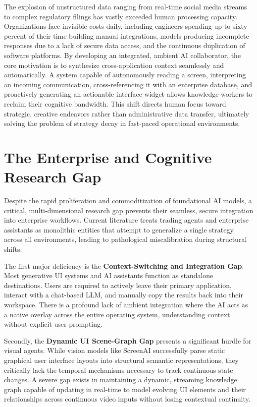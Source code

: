 \documentclass[12pt, a4paper]{report}
\begin{document}
The explosion of unstructured data ranging from real-time social media streams to complex regulatory filings has vastly exceeded human processing capacity. Organizations face invisible costs daily, including engineers spending up to sixty percent of their time building manual integrations, models producing incomplete responses due to a lack of secure data access, and the continuous duplication of software platforms.\cite{rootstack2026} By developing an integrated, ambient AI collaborator, the core motivation is to synthesize cross-application context seamlessly and automatically. A system capable of autonomously reading a screen, interpreting an incoming communication, cross-referencing it with an enterprise database, and proactively generating an actionable interface widget allows knowledge workers to reclaim their cognitive bandwidth.\cite{hojo2025} This shift directs human focus toward strategic, creative endeavors rather than administrative data transfer, ultimately solving the problem of strategy decay in fast-paced operational environments.

\section{The Enterprise and Cognitive Research Gap}
Despite the rapid proliferation and commoditization of foundational AI models, a critical, multi-dimensional research gap prevents their seamless, secure integration into enterprise workflows. Current literature treats trading agents and enterprise assistants as monolithic entities that attempt to generalize a single strategy across all environments, leading to pathological miscalibration during structural shifts.

The first major deficiency is the \textbf{Context-Switching and Integration Gap}. Most generative UI systems and AI assistants function as standalone destinations.\cite{hojo2025} Users are required to actively leave their primary application, interact with a chat-based LLM, and manually copy the results back into their workspace.\cite{hojo2025} There is a profound lack of ambient integration where the AI acts as a native overlay across the entire operating system, understanding context without explicit user prompting.

Secondly, the \textbf{Dynamic UI Scene-Graph Gap} presents a significant hurdle for visual agents. While vision models like ScreenAI successfully parse static graphical user interface layouts into structural semantic representations, they critically lack the temporal mechanisms necessary to track continuous state changes.\cite{hojo2025} A severe gap exists in maintaining a dynamic, streaming knowledge graph capable of updating in real-time to model evolving UI elements and their relationships across continuous video inputs without losing contextual continuity.\cite{hojo2025}
\end{document}
